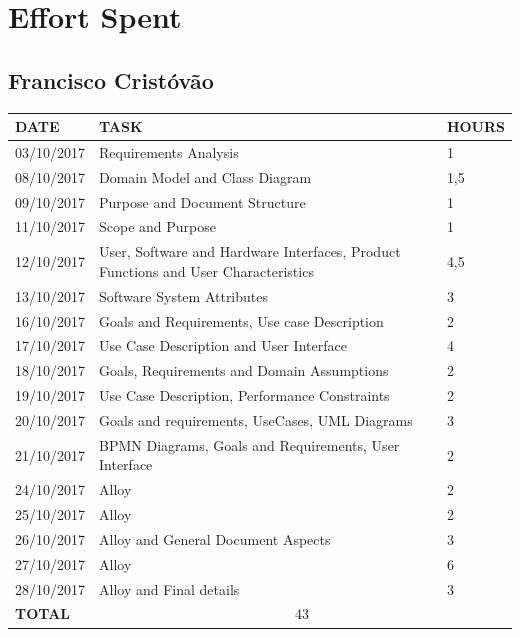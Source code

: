 \documentclass[12pt]{article}
\begin{document}
\section{Effort Spent}
\subsection{Francisco Cristóvão}

\begin{center}
\begin{tabular}{ |p{}|p{}|p{}| } 
 \hline
 \textbf{DATE} & \textbf{TASK} & \textbf{HOURS} \\ 
  \hline
 03/10/2017 & Requirements Analysis & 1 \\ 
  \hline
 08/10/2017 & Domain Model and Class Diagram & 1,5 \\ 
  \hline
  09/10/2017 & Purpose and Document Structure & 1 \\ 
  \hline
  11/10/2017 & Scope and Purpose & 1 \\ 
  \hline
  12/10/2017 & User, Software and Hardware Interfaces, Product Functions and User Characteristics & 4,5 \\ 
  \hline
  13/10/2017 & Software System Attributes & 3 \\ 
  \hline
  16/10/2017 & Goals and Requirements, Use case Description & 2 \\ 
  \hline
  17/10/2017 & Use Case Description and User Interface & 4 \\ 
  \hline
  18/10/2017 & Goals, Requirements and Domain Assumptions & 2 \\ 
  \hline
  19/10/2017 & Use Case Description, Performance Constraints & 2 \\ 
  \hline
  20/10/2017 & Goals and requirements, UseCases, UML Diagrams & 3 \\ 
  \hline
  21/10/2017 & BPMN Diagrams, Goals and Requirements, User Interface & 2 \\ 
  \hline
  24/10/2017 & Alloy & 2 \\ 
  \hline
  25/10/2017 & Alloy & 2 \\ 
  \hline
  26/10/2017 & Alloy and General Document Aspects & 3 \\ 
  \hline
  27/10/2017 & Alloy & 6 \\ 
  \hline
  28/10/2017 & Alloy and Final details & 3 \\ 
  \hline
  \textbf{TOTAL} & \multicolumn{2}{c|}{43} \\ 
  \hline
\end{tabular}
\end{center}
\end{document}
